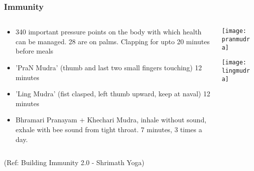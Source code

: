 \begin{frame}[fragile]\frametitle{Immunity}

\begin{columns}
    \begin{column}[T]{0.6\linewidth}
		\begin{itemize}
		\item 340 important pressure points on the body with which health can be managed. 28 are on palms. Clapping for upto 20 minutes before meals
		\item 'PraN Mudra' (thumb and last two small fingers touching) 12 minutes
		\item 'Ling Mudra' (fist clasped, left thumb upward, keep at naval) 12 minutes
		\item Bhramari Pranayam + Khechari Mudra, inhale without sound, exhale with bee sound from tight throat. 7 minutes, 3 times a day.
		\end{itemize}

    \end{column}
    \begin{column}[T]{0.4\linewidth}
		\begin{center}
		\texttt{[image: pranmudra]}
		
		\texttt{[image: lingmudra]}
		
		\end{center}	
    \end{column}
  \end{columns}
  


{\tiny (Ref:  Building Immunity 2.0 - Shrimath Yoga)}

\end{frame}

